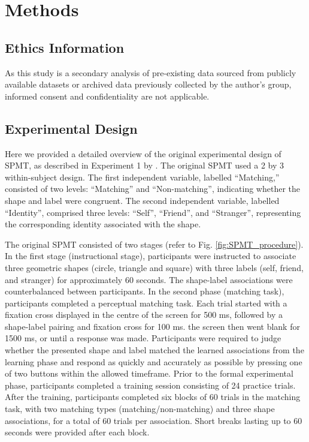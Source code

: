 \documentclass[sn-apa]{sn-jnl}%
\theoremstyle{thmstyleone}%
\theoremstyle{thmstyletwo}%
\theoremstyle{thmstylethree}%
\begin{document}
\section{Methods}\label{sec:method}

\subsection{Ethics Information}\label{subsec:ethics}

As this study is a secondary analysis of pre-existing data sourced from publicly available datasets or archived data previously collected by the author's group, informed consent and confidentiality are not applicable.

\subsection{Experimental Design}\label{subsec:experimentdesign}

Here we provided a detailed overview of the original experimental design of SPMT, as described in Experiment 1 by \textcite{sui2012perceptual}. The original SPMT used a 2 by 3 within-subject design. The first independent variable, labelled ``Matching,” consisted of two levels: ``Matching” and ``Non-matching”, indicating whether the shape and label were congruent. The second independent variable, labelled ``Identity”, comprised three levels: ``Self”, ``Friend”, and ``Stranger”, representing the corresponding identity associated with the shape.

The original SPMT consisted of two stages (refer to Fig. \ref{fig:SPMT_procedure}). In the first stage (instructional stage), participants were instructed to associate three geometric shapes (circle, triangle and square) with three labels (self, friend, and stranger) for approximately 60 seconds. The shape-label associations were counterbalanced between participants. In the second phase (matching task), participants completed a perceptual matching task. Each trial started with a fixation cross displayed in the centre of the screen for 500 ms, followed by a shape-label pairing and fixation cross for 100 ms. the screen then went blank for 1500 ms, or until a response was made. Participants were required to judge whether the presented shape and label matched the learned associations from the learning phase and respond as quickly and accurately as possible by pressing one of two buttons within the allowed timeframe. Prior to the formal experimental phase, participants completed a training session consisting of 24 practice trials. After the training, participants completed six blocks of 60 trials in the matching task, with two matching types (matching/non-matching) and three shape associations, for a total of 60 trials per association. Short breaks lasting up to 60 seconds were provided after each block.
 
\end{document}
